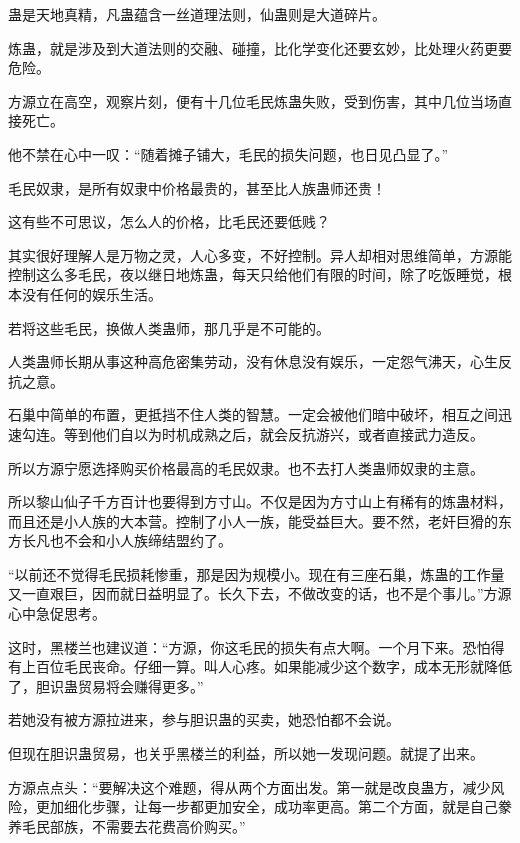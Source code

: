 
\begin{this_body}

蛊是天地真精，凡蛊蕴含一丝道理法则，仙蛊则是大道碎片。

炼蛊，就是涉及到大道法则的交融、碰撞，比化学变化还要玄妙，比处理火药更要危险。

方源立在高空，观察片刻，便有十几位毛民炼蛊失败，受到伤害，其中几位当场直接死亡。

他不禁在心中一叹：“随着摊子铺大，毛民的损失问题，也日见凸显了。”

毛民奴隶，是所有奴隶中价格最贵的，甚至比人族蛊师还贵！

这有些不可思议，怎么人的价格，比毛民还要低贱？

其实很好理解人是万物之灵，人心多变，不好控制。异人却相对思维简单，方源能控制这么多毛民，夜以继日地炼蛊，每天只给他们有限的时间，除了吃饭睡觉，根本没有任何的娱乐生活。

若将这些毛民，换做人类蛊师，那几乎是不可能的。

人类蛊师长期从事这种高危密集劳动，没有休息没有娱乐，一定怨气沸天，心生反抗之意。

石巢中简单的布置，更抵挡不住人类的智慧。一定会被他们暗中破坏，相互之间迅速勾连。等到他们自以为时机成熟之后，就会反抗游兴，或者直接武力造反。

所以方源宁愿选择购买价格最高的毛民奴隶。也不去打人类蛊师奴隶的主意。

所以黎山仙子千方百计也要得到方寸山。不仅是因为方寸山上有稀有的炼蛊材料，而且还是小人族的大本营。控制了小人一族，能受益巨大。要不然，老奸巨猾的东方长凡也不会和小人族缔结盟约了。

“以前还不觉得毛民损耗惨重，那是因为规模小。现在有三座石巢，炼蛊的工作量又一直艰巨，因而就日益明显了。长久下去，不做改变的话，也不是个事儿。”方源心中急促思考。

这时，黑楼兰也建议道：“方源，你这毛民的损失有点大啊。一个月下来。恐怕得有上百位毛民丧命。仔细一算。叫人心疼。如果能减少这个数字，成本无形就降低了，胆识蛊贸易将会赚得更多。”

若她没有被方源拉进来，参与胆识蛊的买卖，她恐怕都不会说。

但现在胆识蛊贸易，也关乎黑楼兰的利益，所以她一发现问题。就提了出来。

方源点点头：“要解决这个难题，得从两个方面出发。第一就是改良蛊方，减少风险，更加细化步骤，让每一步都更加安全，成功率更高。第二个方面，就是自己豢养毛民部族，不需要去花费高价购买。”


\end{this_body}
